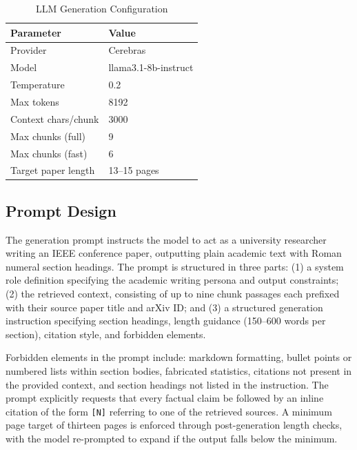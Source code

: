\documentclass[12pt, a4paper]{article}
\begin{document}
\begin{table}[h]
  \centering
  \caption{LLM Generation Configuration}
  \label{tab:config}
  \begin{tabular}{ll}
    \toprule
    \textbf{Parameter} & \textbf{Value} \\
    \midrule
    Provider            & Cerebras              \\
    Model               & llama3.1-8b-instruct  \\
    Temperature         & 0.2                   \\
    Max tokens          & 8192                  \\
    Context chars/chunk & 3000                  \\
    Max chunks (full)   & 9                     \\
    Max chunks (fast)   & 6                     \\
    Target paper length & 13--15 pages          \\
    \bottomrule
  \end{tabular}
\end{table}

\subsection{Prompt Design}

The generation prompt instructs the model to act as a university researcher writing
an IEEE conference paper, outputting plain academic text with Roman numeral section
headings. The prompt is structured in three parts: (1) a system role definition
specifying the academic writing persona and output constraints; (2) the retrieved
context, consisting of up to nine chunk passages each prefixed with their source
paper title and arXiv ID; and (3) a structured generation instruction specifying
section headings, length guidance (150--600 words per section), citation style,
and forbidden elements.

Forbidden elements in the prompt include: markdown formatting, bullet points or
numbered lists within section bodies, fabricated statistics, citations not present
in the provided context, and section headings not listed in the instruction.
The prompt explicitly requests that every factual claim be followed by an inline
citation of the form \texttt{[N]} referring to one of the retrieved sources. A
minimum page target of thirteen pages is enforced through post-generation length
checks, with the model re-prompted to expand if the output falls below the minimum.
\end{document}
